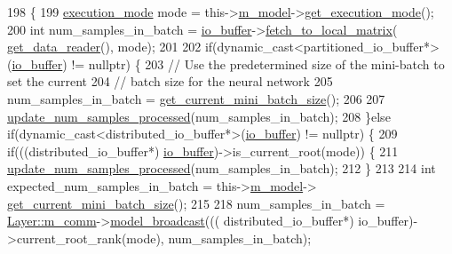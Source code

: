 \begin{DoxyCode}
198                              \{
199     \hyperlink{base_8hpp_a2781a159088df64ed7d47cc91c4dc0a8}{execution\_mode} mode = this->\hyperlink{classlbann_1_1Layer_a3d9315e99574166f2f33e37b572021d2}{m\_model}->\hyperlink{classlbann_1_1model_addb40597cf29aa6d31b6a7d09ef48608}{get\_execution\_mode}();
200     \textcolor{keywordtype}{int} num\_samples\_in\_batch = \hyperlink{classlbann_1_1generic__input__layer_a9dfe8b9afaebc7a5bcb0177ee2ab428f}{io\_buffer}->\hyperlink{classlbann_1_1generic__io__buffer_af9fc2100d41328fe399acf7bced950d7}{fetch\_to\_local\_matrix}(
      \hyperlink{classlbann_1_1generic__input__layer_aba732becdb02627e3ad4493ac19e8fb6}{get\_data\_reader}(), mode);
201 
202     \textcolor{keywordflow}{if}(dynamic\_cast<partitioned\_io\_buffer*>(\hyperlink{classlbann_1_1generic__input__layer_a9dfe8b9afaebc7a5bcb0177ee2ab428f}{io\_buffer}) != \textcolor{keyword}{nullptr}) \{
203       \textcolor{comment}{// Use the predetermined size of the mini-batch to set the current}
204       \textcolor{comment}{// batch size for the neural network}
205       num\_samples\_in\_batch = \hyperlink{classlbann_1_1generic__input__layer_a41d278999fbd10d2cd95b9af04925cf7}{get\_current\_mini\_batch\_size}();
206 
207       \hyperlink{classlbann_1_1generic__input__layer_a0c2f123432ec6af168012cc8699a1d3f}{update\_num\_samples\_processed}(num\_samples\_in\_batch);
208     \}\textcolor{keywordflow}{else} \textcolor{keywordflow}{if}(dynamic\_cast<distributed\_io\_buffer*>(\hyperlink{classlbann_1_1generic__input__layer_a9dfe8b9afaebc7a5bcb0177ee2ab428f}{io\_buffer}) != \textcolor{keyword}{nullptr}) \{
209       \textcolor{keywordflow}{if}(((distributed\_io\_buffer*) \hyperlink{classlbann_1_1generic__input__layer_a9dfe8b9afaebc7a5bcb0177ee2ab428f}{io\_buffer})->is\_current\_root(mode)) \{
211         \hyperlink{classlbann_1_1generic__input__layer_a0c2f123432ec6af168012cc8699a1d3f}{update\_num\_samples\_processed}(num\_samples\_in\_batch);
212       \}
213 
214       \textcolor{keywordtype}{int} expected\_num\_samples\_in\_batch = this->\hyperlink{classlbann_1_1Layer_a3d9315e99574166f2f33e37b572021d2}{m\_model}->
      \hyperlink{classlbann_1_1model_a3eaad8fd538b99ecab9afca6dc3327fd}{get\_current\_mini\_batch\_size}();
215 
218       num\_samples\_in\_batch = \hyperlink{classlbann_1_1Layer_a5de05c52f22e0bbd7c703bec3ad4dbf2}{Layer::m\_comm}->\hyperlink{classlbann_1_1lbann__comm_a929f44a9a9563ae9e4ffe7d44235a195}{model\_broadcast}(((
      distributed\_io\_buffer*) io\_buffer)->current\_root\_rank(mode), num\_samples\_in\_batch);

\end{DoxyCode}
